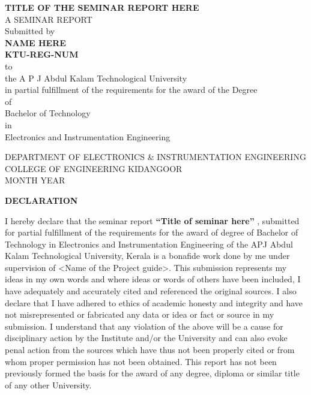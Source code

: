\documentclass[12pt,a4paper]{report}
\begin{document}
\begin{center}
{\Large \textbf{TITLE OF THE SEMINAR REPORT HERE}}\\
\vspace{2cm}
A SEMINAR REPORT\\
\vspace{0.5cm}
Submitted by \\
\vspace{1cm}
\textbf{NAME HERE}\\
\vspace{0.2cm}
\textbf{KTU-REG-NUM}\\
\vspace{0.2cm} to\\


 the A P J Abdul Kalam Technological University \\
in partial fulfillment of the requirements for the award of the Degree \\
of\\
Bachelor of Technology \\
in\\
Electronics and Instrumentation Engineering
\end{center}


\begin{center}

\vspace{1.2cm}


DEPARTMENT OF ELECTRONICS \& INSTRUMENTATION ENGINEERING\\

COLLEGE OF ENGINEERING KIDANGOOR\\

MONTH YEAR\\
\end{center}

\thispagestyle{empty}
\newpage
\begin{center}
\textbf{DECLARATION}\\
\end{center}
I hereby declare that the seminar report \textbf{“Title of seminar here”} , submitted for partial fulfillment of the requirements for the award of degree of Bachelor of Technology in Electronics and Instrumentation Engineering of the APJ Abdul Kalam Technological University, Kerala is a bonafide work done by me
under supervision of <Name of the Project guide>. This submission represents my ideas in my own words and where ideas or words of others have been included, I have adequately and accurately cited and referenced the original sources. I also declare that I have adhered to ethics of academic honesty and integrity and have not misrepresented or fabricated any data or idea or fact or source in my submission. I understand that any violation of the above will be a cause for disciplinary action by the Institute and/or the University and can also evoke penal action from the sources which have thus not been properly cited or from whom proper permission has not been obtained. This report has not been previously formed the basis for the award of any degree, diploma or similar title of any other University.
\end{document}
